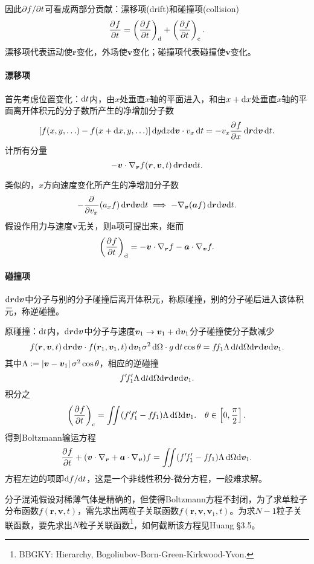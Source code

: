 因此$\p f/\p t$可看成两部分贡献：漂移项(drift)和碰撞项(collision)
\begin{align}
	\pv ft=\kh{\pv ft}_\df+\kh{\pv ft}_\cll.
\end{align}
漂移项代表运动使$\bm r$变化，外场使$\bm v$变化；碰撞项代表碰撞使$\bm v$变化。
\paragraph{漂移项}首先考虑位置变化：$\d t$内，由$x$处垂直$x$轴的平面进入，和由$x+\d x$处垂直$x$轴的平面离开体积元的分子数所产生的净增加分子数
\[
	\fkh{f(x,y,\ldots)-f(x+\d x,y,\ldots)}\d y\nd z\nd\bm v\cdot v_x\d t=-v_x\pv fx\d\bm r\nd\bm v\d t.
\]
计所有分量
\[
	-\bm v\cdot\nabla_{\bm r}f(\bm r,\bm v,t)\d\bm r\nd\bm v\nd t.
\]

类似的，$x$方向速度变化所产生的净增加分子数
\[
	-\pp{v_x}(a_xf)\d\bm r\nd\bm v\nd t\implies-\nabla_{\bm v}(\bm af)\d\bm r\nd\bm v\nd t.
\]
假设作用力与速度$\bm v$无关，则$\bm a$项可提出来，继而
\begin{align}
	\kh{\pv ft}_\df=-\bm v\cdot\nabla_{\bm r}f-\bm a\cdot\nabla_{\bm v}f.
\end{align}
\paragraph{碰撞项}$\d\bm r\nd\bm v$中分子与别的分子碰撞后离开体积元，称原碰撞，别的分子碰后进入该体积元，称逆碰撞。

原碰撞：$\d t$内，$\d\bm r\nd\bm v$中分子与速度$\bm v_1\to\bm v_1+\d\bm v_1$分子碰撞使分子数减少
\[
	f(\bm r,\bm v,t)\d\bm r\nd\bm v\cdot f(\bm r_1,\bm v_1,t)\d\bm v_1\sigma^2\d\Omega\cdot g\d t\cos\theta=f\!f_1\Lambda\d t\nd\Omega\nd\bm r\nd\bm v\nd\bm v_1.
\]
其中$\Lambda:=\abs{\bm v-\bm v_1}\sigma^2\cos\theta$，相应的逆碰撞
\[
	f'\!f_1'\Lambda\d t\nd\Omega\nd\bm r\nd\bm v\nd\bm v_1.
\]
积分之
\begin{align}
	\kh{\pv ft}_\cll=\iint(f'\!f_1'-f\!f_1)\Lambda\d\Omega\nd\bm v_1.\quad\theta\in\fkh{0,\frac\pi{2}}.
\end{align}
得到Boltzmann输运方程
\begin{align}
	\pv ft+(\bm v\cdot\nabla_{\bm r}+\bm a\cdot\nabla_{\bm v})f=\iint(f'\!f_1'-f\!f_1)\Lambda\d\Omega\nd\bm v_1.
\end{align}
方程左边的项即$\d f/\nd t$，这是一个非线性积分-微分方程，一般难求解。

分子混沌假设对稀薄气体是精确的，但使得Boltzmann方程不封闭，为了求单粒子分布函数$f(\bm r,\bm v,t)$，需先求出两粒子关联函数$f(\bm r,\bm v,\bm v_1,t)$。为求$N-1$粒子关联函数，要先求出$N$粒子关联函数\footnote{BBGKY: Hierarchy, Bogoliubov-Born-Green-Kirkwood-Yvon.}，如何截断该方程见Huang \S 3.5。

